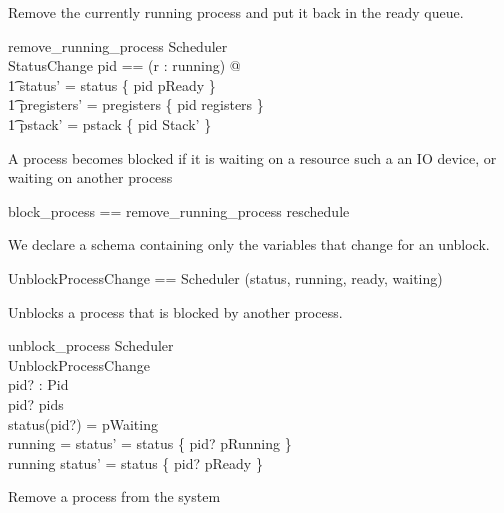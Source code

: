 Remove the currently running process and put it back in the ready queue.

\begin{schema}{remove\_running\_process}
    \Delta Scheduler\\
    \Xi StatusChange
\where
    \LET pid == (\mu r : running) @\\
	\t1 status' = status \oplus \{ pid \mapsto pReady \} \land\\
	\t1 pregisters' = pregisters \oplus \{ pid \mapsto registers \} \land\\
	\t1 pstack' = pstack \oplus \{ pid \mapsto \theta Stack' \}
\end{schema}

A process becomes blocked if it is waiting on a resource such a an IO
device, or waiting on another process 

\begin{zed}
    block\_process == remove\_running\_process \semi reschedule
\end{zed}

We declare a schema containing only the variables that change for an
unblock.

\begin{zed}
    UnblockProcessChange == Scheduler \hide (status, running, ready, waiting)
\end{zed}

Unblocks a process that is blocked by another process.

\begin{schema}{unblock\_process}
    \Delta Scheduler\\
    \Xi UnblockProcessChange\\
    pid? : Pid\\
\where
    pid? \in pids\\
    status(pid?) = pWaiting\\
    running = \emptyset \iff status' = status \oplus \{ pid? \mapsto pRunning \}\\
    running \neq \emptyset \iff status' = status \oplus \{ pid? \mapsto pReady \}
\end{schema}

Remove a process from the system

